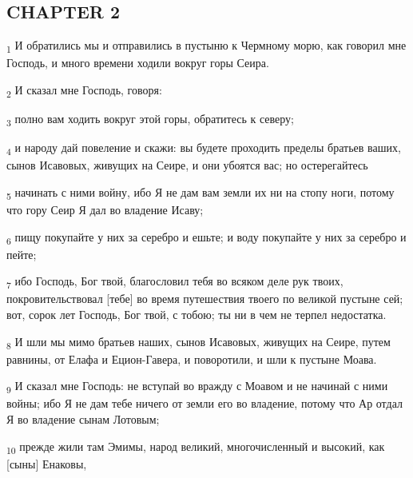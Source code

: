 \subsection{CHAPTER 2}
\begin{tcolorbox}
\textsubscript{1} И обратились мы и отправились в пустыню к Чермному морю, как говорил мне Господь, и много времени ходили вокруг горы Сеира.
\end{tcolorbox}
\begin{tcolorbox}
\textsubscript{2} И сказал мне Господь, говоря:
\end{tcolorbox}
\begin{tcolorbox}
\textsubscript{3} полно вам ходить вокруг этой горы, обратитесь к северу;
\end{tcolorbox}
\begin{tcolorbox}
\textsubscript{4} и народу дай повеление и скажи: вы будете проходить пределы братьев ваших, сынов Исавовых, живущих на Сеире, и они убоятся вас; но остерегайтесь
\end{tcolorbox}
\begin{tcolorbox}
\textsubscript{5} начинать с ними войну, ибо Я не дам вам земли их ни на стопу ноги, потому что гору Сеир Я дал во владение Исаву;
\end{tcolorbox}
\begin{tcolorbox}
\textsubscript{6} пищу покупайте у них за серебро и ешьте; и воду покупайте у них за серебро и пейте;
\end{tcolorbox}
\begin{tcolorbox}
\textsubscript{7} ибо Господь, Бог твой, благословил тебя во всяком деле рук твоих, покровительствовал [тебе] во время путешествия твоего по великой пустыне сей; вот, сорок лет Господь, Бог твой, с тобою; ты ни в чем не терпел недостатка.
\end{tcolorbox}
\begin{tcolorbox}
\textsubscript{8} И шли мы мимо братьев наших, сынов Исавовых, живущих на Сеире, путем равнины, от Елафа и Ецион-Гавера, и поворотили, и шли к пустыне Моава.
\end{tcolorbox}
\begin{tcolorbox}
\textsubscript{9} И сказал мне Господь: не вступай во вражду с Моавом и не начинай с ними войны; ибо Я не дам тебе ничего от земли его во владение, потому что Ар отдал Я во владение сынам Лотовым;
\end{tcolorbox}
\begin{tcolorbox}
\textsubscript{10} прежде жили там Эмимы, народ великий, многочисленный и высокий, как [сыны] Енаковы,
\end{tcolorbox}
